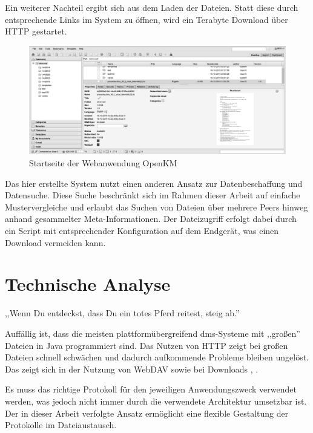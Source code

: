 \documentclass[oneside, ngerman, toc=bibliography,bibliography=totoc,listof=entryprefix, open=right,numbers=noenddot,fontsize=12pt]{scrbook}
\newcommand\chapmd[2]{\begin{mdframed}[%
		rightline=false,leftline=false,topline=false,bottomline=false,frametitlerule=false,
		userdefinedwidth=\textwidth,frametitlealignment=\flushright, %
		frametitlerulecolor=black,frametitle={\small #1}]
		\flushright{} \footnotesize{} #2
	\end{mdframed}}
\begin{document}
Ein weiterer Nachteil ergibt sich aus dem Laden der Dateien. Statt diese durch entsprechende Links im System zu öffnen, wird ein Terabyte Download über HTTP gestartet. 

\begin{figure}[htbp] 
    \centering
    \includegraphics[width=\textwidth]{Masterarbeit_Bilder/openkm.png}
    \caption{Startseite der Webanwendung OpenKM}
    \label{openkm:home}
\end{figure}  


Das hier erstellte System nutzt einen anderen Ansatz zur Datenbeschaffung und Datensuche. Diese Suche beschränkt sich im Rahmen dieser Arbeit auf einfache Mustervergleiche und erlaubt das Suchen von Dateien über mehrere Peers hinweg anhand gesammelter Meta-Informationen. 
Der Dateizugriff erfolgt dabei durch ein Script mit entsprechender Konfiguration auf dem Endgerät, was einen Download vermeiden kann.



\chapter{Technische Analyse}
\label{chap:techAnal}
\chapmd{ Eine Weisheit der Dakota-Indianer}{,,Wenn Du entdeckst, dass Du ein totes Pferd reitest, steig ab.''}
 
Auffällig ist, dass die meisten plattformübergreifend \acrshort{dms}-Systeme mit ,,großen'' Dateien in Java programmiert sind. Das Nutzen von HTTP zeigt bei großen Dateien schnell schwächen und dadurch aufkommende Probleme bleiben ungelöst. Das zeigt sich in der Nutzung von WebDAV sowie bei Downloads \cite{davlimit}, \cite{httplimit}.

Es muss das richtige Protokoll für den jeweiligen Anwendungszweck verwendet werden, was jedoch nicht immer durch die verwendete Architektur umsetzbar ist. 
Der in dieser Arbeit verfolgte Ansatz ermöglicht eine flexible Gestaltung der Protokolle im Dateiaustausch.
\end{document}
